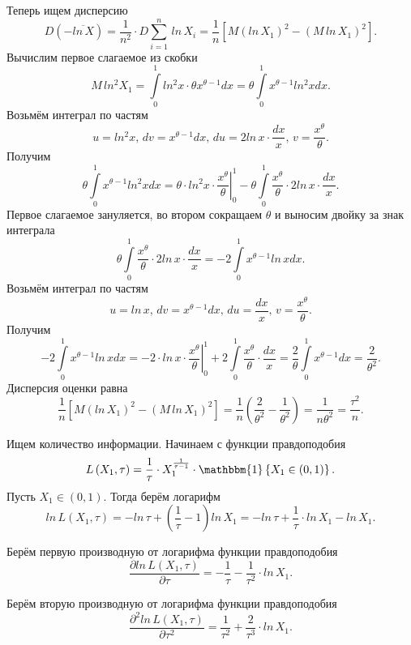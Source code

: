 Теперь ищем дисперсию
$$D \left( - \overline{ln \, X} \right) =
  \frac{1}{n^2} \cdot D \sum \limits_{i = 1}^n \, ln \, X_i =
  \frac{1}{n} \left[ M \left( ln \, X_1 \right)^2 - \left( M \, ln \, X_1 \right)^2 \right].$$
Вычислим первое слагаемое из скобки
$$M \, ln^2 X_1 =
  \int \limits_0^1 ln^2 x \cdot \theta x^{ \theta - 1} dx =
  \theta \int \limits_0^1 x^{ \theta - 1} ln^2 xdx.$$
Возьмём интеграл по частям
$$u = ln^2 x, \,
  dv = x^{ \theta - 1} dx, \,
  du = 2ln \, x \cdot \frac{dx}{x}, \,
  v = \frac{x^{ \theta }}{ \theta }.$$
Получим
$$ \theta \int \limits_0^1 x^{ \theta - 1} ln^2 xdx =
  \theta \cdot \left. ln^2 x \cdot \frac{x^{ \theta }}{ \theta } \right|_0^1 -
  \theta \int \limits_0^1 \frac{x^{ \theta }}{ \theta } \cdot 2ln \, x \cdot \frac{dx}{x}.$$
Первое слагаемое зануляется, во втором сокращаем $ \theta $ и выносим двойку за знак интеграла
$$ \theta \int \limits_0^1 \frac{x^{ \theta }}{ \theta } \cdot 2ln \, x \cdot \frac{dx}{x} =
  -2 \int \limits_0^1 x^{ \theta - 1} ln \, xdx.$$
Возьмём интеграл по частям
$$u = ln \, x, \,
  dv = x^{ \theta - 1} dx, \,
  du = \frac{dx}{x}, \,
  v = \frac{x^{ \theta }}{ \theta }.$$
Получим
$$-2 \int \limits_0^1 x^{ \theta - 1} ln \, xdx =
  -2 \cdot \left. ln \, x \cdot \frac{x^{ \theta }}{ \theta } \right|_0^1 +
  2 \int \limits_0^1 \frac{x^{ \theta }}{ \theta } \cdot \frac{dx}{x} =
  \frac{2}{ \theta } \int \limits_0^1 x^{ \theta - 1} dx =
  \frac{2}{ \theta^2}.$$
Дисперсия оценки равна
$$ \frac{1}{n} \left[ M \left( ln \, X_1 \right)^2 - \left( M \, ln \, X_1 \right)^2 \right] =
  \frac{1}{n} \left( \frac{2}{ \theta^2} - \frac{1}{ \theta^2} \right) =
  \frac{1}{n \theta^2} =
  \frac{ \tau^2}{n}.$$

Ищем количество информации. Начинаем с функции правдоподобия
$$L \left( X_1, \tau \right) =
  \frac{1}{ \tau } \cdot X_1^{ \frac{1}{ \tau - 1}} \cdot
  \mathbbm{1} \left\{ X_1 \in \left( 0, 1 \right) \right\}.$$
Пусть $X_1 \in \left( 0, 1 \right) $.
Тогда берём логарифм
$$ln \, L \left( X_1, \tau \right) =
  -ln \, \tau + \left( \frac{1}{ \tau } - 1 \right) ln \, X_1 =
  -ln \, \tau + \frac{1}{ \tau } \cdot ln \, X_1 - ln \, X_1.$$

Берём первую производную от логарифма функции правдоподобия
$$ \frac{ \partial ln \, L \left( X_1, \tau \right) }{ \partial \tau } =
  - \frac{1}{ \tau } - \frac{1}{ \tau^2} \cdot ln \, X_1.$$

Берём вторую производную от логарифма функции правдоподобия
$$ \frac{ \partial^2 ln \, L \left( X_1, \tau \right) }{ \partial \tau^2} =
  \frac{1}{ \tau^2} + \frac{2}{ \tau^3} \cdot ln \, X_1.$$

